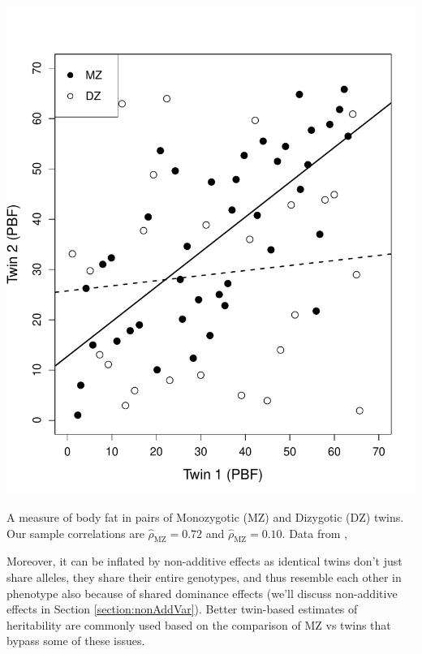  \begin{marginfigure}
 \begin{center}
 \includegraphics[width=\textwidth]{Journal_figs/Quant_gen/twins_body_fat/twins_body_fat.pdf}
 \end{center}
 \caption{A measure of body fat in pairs of Monozygotic (MZ) and
   Dizygotic (DZ) twins. Our sample  correlations are
   $\hat{\rho}_{\text{MZ}}=0.72$ and $\hat{\rho}_{\text{MZ}}=0.10$. Data from \citet{faith1999evidence}, }\label{fig:twins_body_fat}
 \end{marginfigure}
Moreover, it can
be inflated by non-additive effects as identical twins don't just share alleles, they share their entire genotypes, and thus 
resemble each other in phenotype also because of shared dominance
effects (we'll discuss non-additive effects in Section \ref{section:nonAddVar}). Better twin-based estimates of heritability are commonly
used based on the comparison of MZ vs twins that bypass some of these issues.\\


